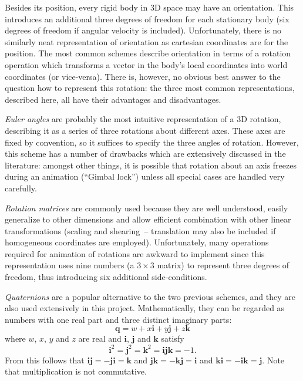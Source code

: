 Besides its position, every rigid body in 3D space may have an orientation. This introduces an
additional three degrees of freedom for each stationary body (six degrees of freedom if
angular velocity is included). Unfortunately, there is no similarly neat representation of
orientation as cartesian coordinates are for the position. The most common schemes describe
orientation in terms of a rotation operation which transforms a vector in the body's local
coordinates into world coordinates (or vice-versa). There is, however, no obvious best
answer to the question how to represent this rotation: the three most common representations,
described here, all have their advantages and disadvantages.

{\em Euler angles} are probably the most intuitive representation of a 3D rotation, describing
it as a series of three rotations about different axes. These axes are fixed by convention, so it
suffices to specify the three angles of rotation. However, this scheme has a number of drawbacks
which are extensively discussed in the literature: amongst other things, it is possible that
rotation about an axis freezes during an animation (``Gimbal lock'') unless all special cases
are handled very carefully.

{\em Rotation matrices} are commonly used because they are well understood, easily generalize
to other dimensions and allow efficient combination with other linear transformations (scaling
and shearing~-- translation may also be included if homogeneous coordinates are employed).
Unfortunately, many operations required for animation of rotations are awkward to implement
since this representation uses nine numbers (a $3\times3$ matrix) to represent three degrees
of freedom, thus introducing six additional side-conditions.

{\em Quaternions} are a popular alternative to the two previous schemes, and they are also
used extensively in this project. Mathematically, they can be regarded as numbers with one real
part and three distinct imaginary parts:
\begin{equation}
\mathbf{q} = w + x\mathbf{i} + y\mathbf{j} + z\mathbf{k}
\end{equation}
where $w$, $x$, $y$ and $z$ are real and $\mathbf{i}$, $\mathbf{j}$ and $\mathbf{k}$ satisfy
\begin{equation}
\mathbf{i}^2 = \mathbf{j}^2 = \mathbf{k}^2 = \mathbf{i}\mathbf{j}\mathbf{k} = -1.
\end{equation}
From this follows that
$\mathbf{i}\mathbf{j} = -\mathbf{j}\mathbf{i} = \mathbf{k}$ and
$\mathbf{j}\mathbf{k} = -\mathbf{k}\mathbf{j} = \mathbf{i}$ and
$\mathbf{k}\mathbf{i} = -\mathbf{i}\mathbf{k} = \mathbf{j}$.
Note that multiplication is not commutative.

